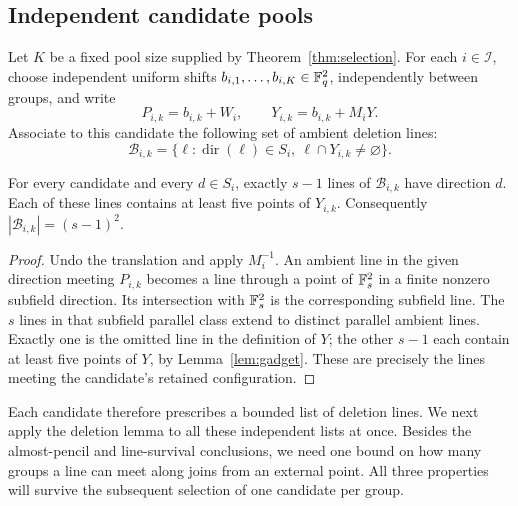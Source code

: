 \subsection{Independent candidate pools}

Let \(K\) be a fixed pool size supplied by
Theorem~\ref{thm:selection}.  For each
\(i\in\mathcal I\), choose independent uniform shifts
\(b_{i,1},\ldots,b_{i,K}\in\mathbb F_q^2\), independently between
groups, and write
\[
 P_{i,k}=b_{i,k}+W_i,
 \qquad Y_{i,k}=b_{i,k}+M_iY.
\]
Associate to this candidate the following set of ambient deletion
lines:
\[
 \mathcal B_{i,k}
 =\{\ell:\operatorname{dir}(\ell)\in S_i,
                  \ \ell\cap Y_{i,k}\ne\varnothing\}.
\]

\begin{lemma}
\label{con-deletion-count}
For every candidate and every \(d\in S_i\), exactly \(s-1\)
lines of \(\mathcal B_{i,k}\) have direction \(d\).  Each of
these lines contains at least five points of \(Y_{i,k}\).
Consequently \(|\mathcal B_{i,k}|=(s-1)^2\).
\end{lemma}

\begin{proof}
Undo the translation and apply \(M_i^{-1}\).  An ambient line in
the given direction meeting \(P_{i,k}\) becomes a line through a
point of \(\mathbb F_s^2\) in a finite nonzero subfield direction.  Its
intersection with \(\mathbb F_s^2\) is the corresponding subfield
line.  The \(s\) lines in that subfield parallel class extend to
distinct parallel ambient lines.  Exactly one is the omitted line
in the definition of \(Y\); the other \(s-1\) each contain at
least five points of \(Y\), by Lemma~\ref{lem:gadget}.  These are
precisely the lines meeting the candidate's retained configuration.
\end{proof}

Each candidate therefore prescribes a bounded list of deletion lines.
We next apply the deletion lemma to all these independent lists at
once.  Besides the almost-pencil and line-survival conclusions, we
need one bound on how many groups a line can meet along joins from an
external point.  All three properties will survive the subsequent
selection of one candidate per group.

